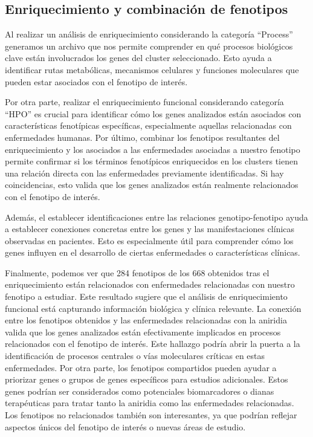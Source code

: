 \subsection{Enriquecimiento y combinación de fenotipos}

Al realizar un análisis de enriquecimiento considerando la categoría “Process” generamos un archivo que nos permite comprender en qué procesos biológicos clave están involucrados los genes del cluster seleccionado. Esto ayuda a identificar rutas metabólicas, mecanismos celulares y funciones moleculares que pueden estar asociados con el fenotipo de interés.

Por otra parte, realizar el enriquecimiento funcional considerando categoría “HPO” es crucial para identificar cómo los genes analizados están asociados con características fenotípicas específicas, especialmente aquellas relacionadas con enfermedades humanas. 
Por último, combinar los fenotipos resultantes del enriquecimiento y los asociados a las enfermedades asociadas a nuestro fenotipo permite confirmar si los términos fenotípicos enriquecidos en los clusters tienen una relación directa con las enfermedades previamente identificadas. Si hay coincidencias, esto valida que los genes analizados están realmente relacionados con el fenotipo de interés.

Además, el establecer identificaciones entre las relaciones genotipo-fenotipo ayuda a establecer conexiones concretas entre los genes y las manifestaciones clínicas observadas en pacientes. Esto es especialmente útil para comprender cómo los genes influyen en el desarrollo de ciertas enfermedades o características clínicas.

Finalmente, podemos ver que 284 fenotipos de los 668 obtenidos tras el enriquecimiento están relacionados con enfermedades relacionadas con nuestro fenotipo a estudiar. Este resultado sugiere que el análisis de enriquecimiento funcional está capturando información biológica y clínica relevante. La conexión entre los fenotipos obtenidos y las enfermedades relacionadas con la aniridia valida que los genes analizados están efectivamente implicados en procesos relacionados con el fenotipo de interés. Este hallazgo podría abrir la puerta a la identificación de procesos centrales o vías moleculares críticas en estas enfermedades.
Por otra parte,  los fenotipos compartidos pueden ayudar a priorizar genes o grupos de genes específicos para estudios adicionales. Estos genes podrían ser considerados como potenciales biomarcadores o dianas terapéuticas para tratar tanto la aniridia como las enfermedades relacionadas.
Los fenotipos no relacionados también son interesantes, ya que podrían reflejar aspectos únicos del fenotipo de interés o nuevas áreas de estudio.





